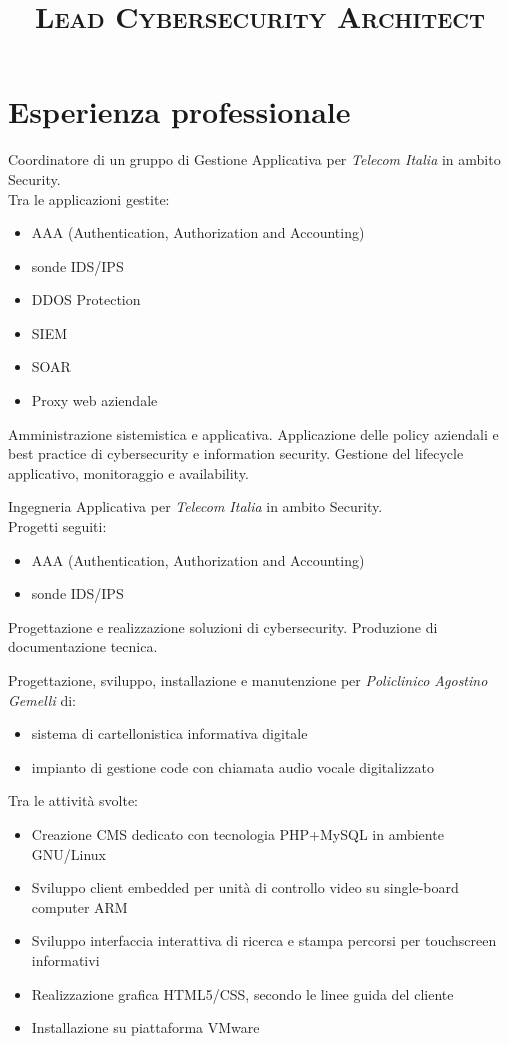 \documentclass[a4paper, 11pt]{moderncv}
\title{\Large{\textsc{Lead Cybersecurity \break Architect}}}
\begin{document}
\makecvtitle

\section{Esperienza professionale}
        {Coordinatore di un gruppo di Gestione Applicativa per \emph{Telecom Italia} in ambito Security.\\ Tra le applicazioni gestite: \begin{itemize}
          \item AAA (Authentication, Authorization and Accounting)
          \item sonde IDS/IPS
          \item DDOS Protection
          \item SIEM
          \item SOAR
          \item Proxy web aziendale
          \end{itemize}
          Amministrazione sistemistica e applicativa. Applicazione delle policy aziendali e best practice di cybersecurity e information security. Gestione del lifecycle applicativo, monitoraggio e availability.}
\vspace{3mm}
        {Ingegneria Applicativa per \emph{Telecom Italia} in ambito Security. \\ Progetti seguiti:
          \begin{itemize}
          \item AAA (Authentication, Authorization and Accounting)
          \item sonde IDS/IPS
        \end{itemize}
        Progettazione e realizzazione soluzioni di cybersecurity. Produzione di documentazione tecnica.}
\vspace{3mm}
        {Progettazione, sviluppo, installazione e manutenzione per \emph{Policlinico Agostino Gemelli} di:
          \begin{itemize}
          \item  sistema di cartellonistica informativa digitale
          \item  impianto di gestione code con chiamata audio vocale digitalizzato
          \end{itemize}
          Tra le attività svolte:
          \begin{itemize}
          \item Creazione CMS dedicato con tecnologia PHP+MySQL in ambiente GNU/Linux
          \item Sviluppo client embedded per unità di controllo video su single-board computer ARM
          \item Sviluppo interfaccia interattiva di ricerca e stampa percorsi per touchscreen informativi
          \item Realizzazione grafica HTML5/CSS, secondo le linee guida del cliente
          \item Installazione su piattaforma VMware
          \end{itemize}}
\end{document}
